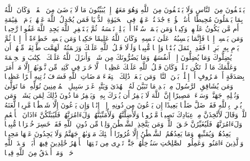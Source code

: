 \startbuffer[\q:4:108]
یَسۡتَخۡفُونَ مِنَ ٱلنَّاسِ وَلَا یَسۡتَخۡفُونَ مِنَ ٱللَّهِ وَهُوَ مَعَهُمۡ إِذۡ یُبَیِّتُونَ مَا لَا یَرۡضَىٰ مِنَ ٱلۡقَوۡلِۚ وَكَانَ ٱللَّهُ بِمَا یَعۡمَلُونَ مُحِیطًا%
\stopbuffer%
\startbuffer[\q:4:109]
هَٰۤأَنتُمۡ هَٰۤؤُلَاۤءِ جَٰدَلۡتُمۡ عَنۡهُمۡ فِی ٱلۡحَیَوٰةِ ٱلدُّنۡیَا فَمَن یُجَٰدِلُ ٱللَّهَ عَنۡهُمۡ یَوۡمَ ٱلۡقِیَٰمَةِ أَم مَّن یَكُونُ عَلَیۡهِمۡ وَكِیلࣰا%
\stopbuffer%
\startbuffer[\q:4:110]
وَمَن یَعۡمَلۡ سُوۤءًا أَوۡ یَظۡلِمۡ نَفۡسَهُۥ ثُمَّ یَسۡتَغۡفِرِ ٱللَّهَ یَجِدِ ٱللَّهَ غَفُورࣰا رَّحِیمࣰا%
\stopbuffer%
\startbuffer[\q:4:111]
وَمَن یَكۡسِبۡ إِثۡمࣰا فَإِنَّمَا یَكۡسِبُهُۥ عَلَىٰ نَفۡسِهِۦۚ وَكَانَ ٱللَّهُ عَلِیمًا حَكِیمࣰا%
\stopbuffer%
\startbuffer[\q:4:112]
وَمَن یَكۡسِبۡ خَطِیۤءَةً أَوۡ إِثۡمࣰا ثُمَّ یَرۡمِ بِهِۦ بَرِیۤءࣰا فَقَدِ ٱحۡتَمَلَ بُهۡتَٰنࣰا وَإِثۡمࣰا مُّبِینࣰا%
\stopbuffer%
\startbuffer[\q:4:113]
وَلَوۡلَا فَضۡلُ ٱللَّهِ عَلَیۡكَ وَرَحۡمَتُهُۥ لَهَمَّت طَّاۤئِفَةࣱ مِّنۡهُمۡ أَن یُضِلُّوكَ وَمَا یُضِلُّونَ إِلَّاۤ أَنفُسَهُمۡۖ وَمَا یَضُرُّونَكَ مِن شَیۡءࣲۚ وَأَنزَلَ ٱللَّهُ عَلَیۡكَ ٱلۡكِتَٰبَ وَٱلۡحِكۡمَةَ وَعَلَّمَكَ مَا لَمۡ تَكُن تَعۡلَمُۚ وَكَانَ فَضۡلُ ٱللَّهِ عَلَیۡكَ عَظِیمࣰا%
\stopbuffer%
\startbuffer[\q:4:114]
۞ لَّا خَیۡرَ فِی كَثِیرࣲ مِّن نَّجۡوَىٰهُمۡ إِلَّا مَنۡ أَمَرَ بِصَدَقَةٍ أَوۡ مَعۡرُوفٍ أَوۡ إِصۡلَٰحِۭ بَیۡنَ ٱلنَّاسِۚ وَمَن یَفۡعَلۡ ذَٰلِكَ ٱبۡتِغَاۤءَ مَرۡضَاتِ ٱللَّهِ فَسَوۡفَ نُؤۡتِیهِ أَجۡرًا عَظِیمࣰا%
\stopbuffer%
\startbuffer[\q:4:115]
وَمَن یُشَاقِقِ ٱلرَّسُولَ مِنۢ بَعۡدِ مَا تَبَیَّنَ لَهُ ٱلۡهُدَىٰ وَیَتَّبِعۡ غَیۡرَ سَبِیلِ ٱلۡمُؤۡمِنِینَ نُوَلِّهِۦ مَا تَوَلَّىٰ وَنُصۡلِهِۦ جَهَنَّمَۖ وَسَاۤءَتۡ مَصِیرًا%
\stopbuffer%
\startbuffer[\q:4:116]
إِنَّ ٱللَّهَ لَا یَغۡفِرُ أَن یُشۡرَكَ بِهِۦ وَیَغۡفِرُ مَا دُونَ ذَٰلِكَ لِمَن یَشَاۤءُۚ وَمَن یُشۡرِكۡ بِٱللَّهِ فَقَدۡ ضَلَّ ضَلَٰلَۢا بَعِیدًا%
\stopbuffer%
\startbuffer[\q:4:117]
إِن یَدۡعُونَ مِن دُونِهِۦۤ إِلَّاۤ إِنَٰثࣰا وَإِن یَدۡعُونَ إِلَّا شَیۡطَٰنࣰا مَّرِیدࣰا%
\stopbuffer%
\startbuffer[\q:4:118]
لَّعَنَهُ ٱللَّهُۘ وَقَالَ لَأَتَّخِذَنَّ مِنۡ عِبَادِكَ نَصِیبࣰا مَّفۡرُوضࣰا%
\stopbuffer%
\startbuffer[\q:4:119]
وَلَأُضِلَّنَّهُمۡ وَلَأُمَنِّیَنَّهُمۡ وَلَءَامُرَنَّهُمۡ فَلَیُبَتِّكُنَّ ءَاذَانَ ٱلۡأَنۡعَٰمِ وَلَءَامُرَنَّهُمۡ فَلَیُغَیِّرُنَّ خَلۡقَ ٱللَّهِۚ وَمَن یَتَّخِذِ ٱلشَّیۡطَٰنَ وَلِیࣰّا مِّن دُونِ ٱللَّهِ فَقَدۡ خَسِرَ خُسۡرَانࣰا مُّبِینࣰا%
\stopbuffer%
\startbuffer[\q:4:120]
یَعِدُهُمۡ وَیُمَنِّیهِمۡۖ وَمَا یَعِدُهُمُ ٱلشَّیۡطَٰنُ إِلَّا غُرُورًا%
\stopbuffer%
\startbuffer[\q:4:121]
أُو۟لَٰۤئِكَ مَأۡوَىٰهُمۡ جَهَنَّمُ وَلَا یَجِدُونَ عَنۡهَا مَحِیصࣰا%
\stopbuffer%
\startbuffer[\q:4:122]
وَٱلَّذِینَ ءَامَنُوا۟ وَعَمِلُوا۟ ٱلصَّٰلِحَٰتِ سَنُدۡخِلُهُمۡ جَنَّٰتࣲ تَجۡرِی مِن تَحۡتِهَا ٱلۡأَنۡهَٰرُ خَٰلِدِینَ فِیهَاۤ أَبَدࣰاۖ وَعۡدَ ٱللَّهِ حَقࣰّاۚ وَمَنۡ أَصۡدَقُ مِنَ ٱللَّهِ قِیلࣰا%

